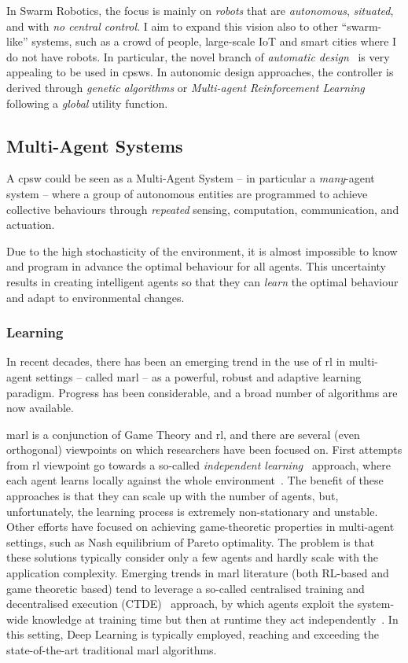 \documentclass[11pt]{article}
\begin{document}
In Swarm Robotics, the focus is mainly on \textit{robots} that are \emph{autonomous}, \emph{situated}, and with \emph{no central control}. 
%
I aim to expand this vision also to other ``swarm-like'' systems, such as a crowd of people, large-scale IoT and smart cities where I do not have robots. 
%
In particular, the novel branch of \textit{automatic design}~\cite{DBLP:journals/firai/FrancescaB16} is very appealing to be used in \acp{cpsw}. 
%
In autonomic design approaches, the controller is derived through \textit{genetic algorithms} or \textit{Multi-agent Reinforcement Learning} following a \textit{global} utility function. 
\subsection{Multi-Agent Systems}
A \ac{cpsw} could be seen as a Multi-Agent System -- in particular a \emph{many}-agent system -- where a group of autonomous entities are programmed to achieve collective behaviours through \emph{repeated} sensing, computation, communication, and actuation.

Due to the high stochasticity of the environment, it is almost impossible to know and program in advance the optimal behaviour for all agents.
%
This uncertainty results in creating intelligent agents so that they can \emph{learn} the optimal behaviour and adapt to environmental changes.
\subsubsection{Learning}
In recent decades, there has been an emerging trend in the use of \ac{rl} 
in multi-agent settings -- called \ac{marl} -- as a powerful, robust and adaptive learning paradigm.
%
Progress has been considerable, and a broad number of algorithms are now available.

\ac{marl} is a conjunction of Game Theory and \ac{rl}, 
 and there are several (even orthogonal) viewpoints on which researchers have been focused on.
%
First attempts from \ac{rl} viewpoint go towards a so-called \textit{independent learning}~\cite{DBLP:journals/tsmc/BusoniuBS08} approach, where each agent learns locally against the whole environment~\cite{DBLP:conf/icml/Tan93}.
%
The benefit of these approaches is that they can scale up with the number of agents, but, unfortunately, the learning process is extremely non-stationary and unstable.
%
Other efforts have focused on achieving game-theoretic properties in multi-agent settings, such as Nash equilibrium of Pareto optimality.
%
The problem is that these solutions typically consider only a few agents and hardly scale with the application complexity.
%
Emerging trends in \ac{marl} literature (both RL-based and game theoretic based) tend to leverage a so-called centralised training and decentralised execution (CTDE)~\cite{DBLP:journals/tcyb/NguyenNN20} approach, by which 
agents exploit the system-wide knowledge at training time but then at runtime they act independently~\cite{DBLP:journals/aamas/Hernandez-LealK19}. 
%
In this setting, Deep Learning is typically employed, reaching and exceeding the state-of-the-art traditional \ac{marl} algorithms.
 
\end{document}
